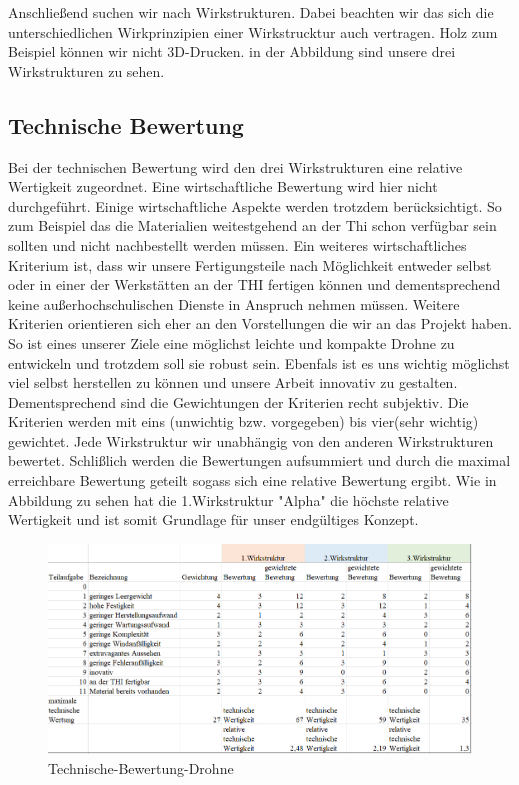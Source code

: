 Anschließend suchen wir nach Wirkstrukturen. Dabei beachten wir das sich die unterschiedlichen Wirkprinzipien einer Wirkstrucktur auch vertragen. Holz zum Beispiel können wir nicht 3D-Drucken. in der Abbildung sind unsere drei Wirkstrukturen zu sehen.



\subsection{Technische Bewertung}
Bei der technischen Bewertung wird den drei Wirkstrukturen eine relative Wertigkeit zugeordnet. Eine wirtschaftliche Bewertung wird hier nicht durchgeführt. Einige wirtschaftliche Aspekte werden trotzdem berücksichtigt. So zum Beispiel das die Materialien weitestgehend an der Thi schon verfügbar sein sollten und nicht nachbestellt werden müssen. Ein weiteres wirtschaftliches Kriterium ist, dass wir unsere Fertigungsteile nach Möglichkeit entweder selbst oder in einer der Werkstätten an der THI fertigen können und dementsprechend keine außerhochschulischen Dienste in Anspruch nehmen müssen.
Weitere Kriterien orientieren sich eher an den Vorstellungen die wir an das Projekt haben. So ist eines unserer Ziele eine möglichst leichte und kompakte Drohne zu entwickeln und trotzdem soll sie robust sein.  Ebenfals ist es uns wichtig möglichst viel selbst herstellen zu können und unsere Arbeit innovativ zu gestalten. Dementsprechend sind die Gewichtungen der Kriterien recht subjektiv. Die Kriterien werden mit eins (unwichtig bzw. vorgegeben) bis vier(sehr wichtig) gewichtet. Jede Wirkstruktur wir unabhängig von den anderen Wirkstrukturen bewertet. Schlißlich werden die Bewertungen aufsummiert und durch die maximal erreichbare Bewertung geteilt sogass sich eine relative Bewertung ergibt. Wie in Abbildung zu sehen hat die 1.Wirkstruktur "Alpha" die höchste relative Wertigkeit und ist somit Grundlage für unser endgültiges Konzept.
\begin{figure}[h!]
	\centering
	\includegraphics[width= 1.00\textwidth]{bilder/Morphologischer_Kasten/BewDrohne}
	\caption{Technische-Bewertung-Drohne}
\end{figure}

